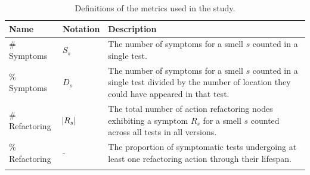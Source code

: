 \begin{table}
\centering

\begin{tabularx}{\textwidth}{>{\raggedright}p{1in}>{\raggedright}p{0.5in}>{\raggedright}p{2.9in}}

\hline
\textbf{Name} & \textbf{Notation} & \textbf{Description} \tabularnewline
\hline

\scriptsize{\# Symptoms} & \scriptsize{$S_s$} & \scriptsize{The number of symptoms for a smell $s$ counted in a single test.} \tabularnewline \noalign{\vspace{4pt}}
\scriptsize{\% Symptoms} & \scriptsize{$D_s$} & \scriptsize{The number of symptoms for a smell $s$ counted in a single test divided by the number of location they could have appeared in that test.} \tabularnewline \noalign{\vspace{4pt}}
\scriptsize{\# Refactoring} & \scriptsize{$\abs{R_{s}}$} & \scriptsize{The total number of action refactoring nodes exhibiting a symptom $R_{s}$ for a smell $s$ counted across all tests in all versions.} \tabularnewline \noalign{\vspace{4pt}}
\scriptsize{\% Refactoring} & \scriptsize{-} & \scriptsize{The proportion of symptomatic tests undergoing at least one refactoring action through their lifespan.} \tabularnewline \noalign{\vspace{4pt}}
\hline

\end{tabularx}

\caption{Definitions of the metrics used in the study.}
\label{tab:metrics}

\end{table}